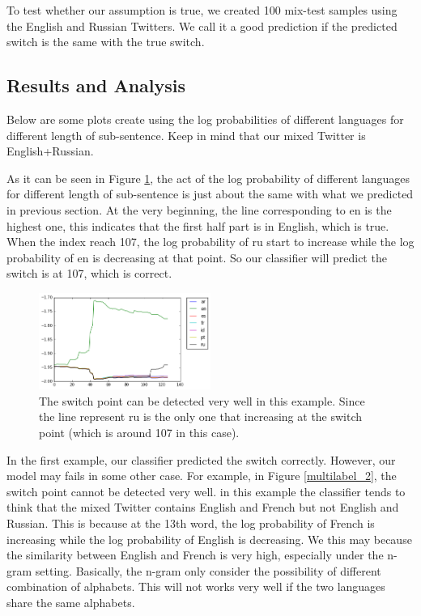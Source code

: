 \documentclass[11pt]{article}
\begin{document}
To test whether our assumption is true, we created 100 mix-test samples using the English and Russian Twitters. We call it a good prediction if the predicted switch is the same with the true switch. 

\subsection{Results and Analysis}
Below are some plots create using the log probabilities of different languages for different length of sub-sentence. Keep in mind that our mixed Twitter is English+Russian.

As it can be seen in Figure \ref{multilabel_1}, the act of the log probability of different languages for different length of sub-sentence is just about the same with what we predicted in previous section. At the very beginning, the line corresponding to en is the highest one, this indicates that the first half part is in English, which is true. When the index reach 107, the log probability of ru start to increase while the log probability of en is decreasing at that point. So our classifier will predict the switch is at 107, which is correct. 


\begin{figure}
\includegraphics[width=0.5\textwidth]{multilabel_1.PNG}
\caption{The switch point can be detected very well in this example. Since the line represent ru is the only one that increasing at the switch point (which is around 107 in this case).}
\label{multilabel_1}
\end{figure}

In the first example, our classifier predicted the switch correctly. However, our model may fails in some other case. For example, in Figure \ref{multilabel_2}, the switch point cannot be detected very well. in this example the classifier tends to think that the mixed Twitter contains English and French but not English and Russian. This is because at the 13th word, the log probability of French is increasing while the log probability of English is decreasing. We this may because the similarity between English and French is very high, especially under the n-gram setting. Basically, the n-gram only consider the possibility of different combination of alphabets. This will not works very well if the two languages share the same alphabets. 
\end{document}
